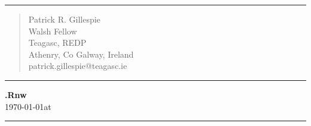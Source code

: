 \documentclass{article}\usepackage{graphicx, color}
\begin{document}
\hrule
\begin{quote}
  \begin{flushleft}
    Patrick R. Gillespie\\
    Walsh Fellow\\
    Teagasc, REDP\\
    Athenry, Co Galway, Ireland\\
    patrick.gillespie@teagasc.ie\\
  \end{flushleft}
\end{quote}
\hrule
\begin{flushleft}
  \textbf{\jobname.Rnw}\\
  \today at \currenttime
\end{flushleft}
\hrule
\vspace{1cm}
\end{document}
